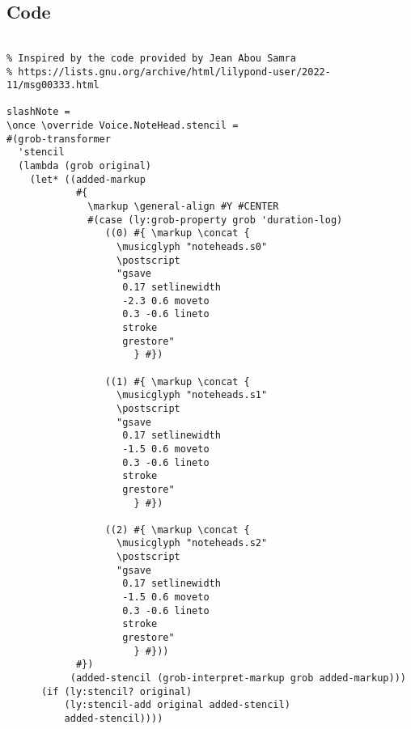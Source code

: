 \subsection{Code}
\begin{verbatim}

% Inspired by the code provided by Jean Abou Samra
% https://lists.gnu.org/archive/html/lilypond-user/2022-11/msg00333.html

slashNote =
\once \override Voice.NoteHead.stencil =
#(grob-transformer
  'stencil
  (lambda (grob original)
    (let* ((added-markup
            #{
              \markup \general-align #Y #CENTER
              #(case (ly:grob-property grob 'duration-log)
                 ((0) #{ \markup \concat {
                   \musicglyph "noteheads.s0"
                   \postscript
                   "gsave 
                    0.17 setlinewidth 
                    -2.3 0.6 moveto 
                    0.3 -0.6 lineto
                    stroke 
                    grestore"
                      } #})

                 ((1) #{ \markup \concat {
                   \musicglyph "noteheads.s1"
                   \postscript
                   "gsave 
                    0.17 setlinewidth 
                    -1.5 0.6 moveto 
                    0.3 -0.6 lineto
                    stroke 
                    grestore"
                      } #})

                 ((2) #{ \markup \concat {
                   \musicglyph "noteheads.s2"
                   \postscript
                   "gsave 
                    0.17 setlinewidth 
                    -1.5 0.6 moveto 
                    0.3 -0.6 lineto
                    stroke 
                    grestore"
                      } #}))
            #})
           (added-stencil (grob-interpret-markup grob added-markup)))
      (if (ly:stencil? original)
          (ly:stencil-add original added-stencil)
          added-stencil))))




\end{verbatim}
